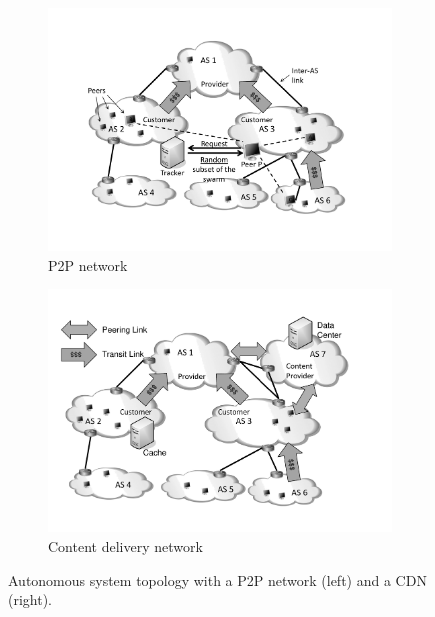 \begin{figure}[bt]
	\centering
\vspace{-0.2cm}
\hspace{-0.5cm}
	\begin{subfigure}[b]{0.54\textwidth}
	  \includegraphics[width=\textwidth]{aslevel/figs/p2p}
    \vspace{-0.5cm}
    \caption{P2P network}
    \label{fig:aslevel:p2p}
  \end{subfigure}
\hspace{-0.5cm}
	\begin{subfigure}[b]{0.54\textwidth}
	 	\includegraphics[width=\textwidth]{aslevel/figs/cdn}
    \vspace{-0.5cm}
    \caption{Content delivery network}
    \label{fig:aslevel:cdn}
	\end{subfigure}
\hspace{-0.5cm}
	\caption{Autonomous system topology with a P2P network (left) and a CDN (right).}\label{fig:aslevel:p2pcdn}
\end{figure}

